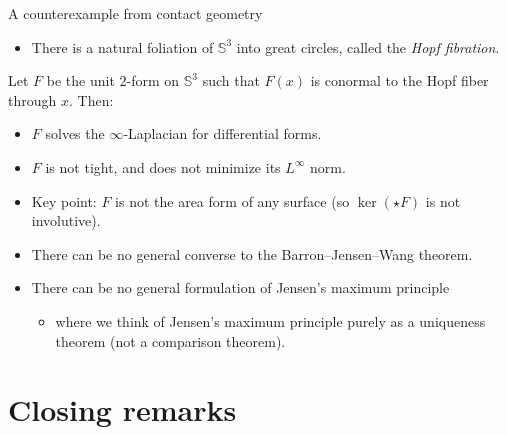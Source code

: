 \documentclass[10pt]{beamer}
\begin{document}
\begin{frame}{A counterexample from contact geometry}
    \begin{itemize}
        \item There is a natural foliation of $\mathbb S^3$ into great circles, called the \emph{Hopf fibration}. \pause
    \end{itemize}

    \begin{example}[B '24: nonuniqueness]
    Let $F$ be the unit $2$-form on $\mathbb S^3$ such that $F(x)$ is conormal to the Hopf fiber through $x$.
    Then: \pause
\begin{itemize}
    \item $F$ solves the $\infty$-Laplacian for differential forms.
    \item $F$ is not tight, and does not minimize its $L^\infty$ norm. \pause
\end{itemize}
\end{example}

\begin{itemize}
\item Key point: $F$ is not the area form of any surface (so $\ker(\star F)$ is not involutive). \pause
\item There can be no general converse to the Barron--Jensen--Wang theorem. \pause
\item There can be no general formulation of Jensen's maximum principle
\begin{itemize}
\item where we think of Jensen's maximum principle purely as a uniqueness theorem (not a comparison theorem).
\end{itemize}
\end{itemize}
\end{frame}

\section{Closing remarks}
\end{document}
